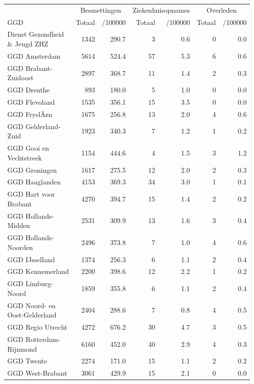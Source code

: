 \documentclass[
  english,
  man,floatsintext]{apa6}
\begin{document}
\begin{table}
\centering\begingroup\fontsize{10}{12}\selectfont

\begin{threeparttable}
\begin{tabular}{lrrrrrr}
\toprule
\multicolumn{1}{c}{ } & \multicolumn{2}{c}{Besmettingen} & \multicolumn{2}{c}{Ziekenhuisopnames} & \multicolumn{2}{c}{Overleden} \\
\cmidrule(l{3pt}r{3pt}){2-3} \cmidrule(l{3pt}r{3pt}){4-5} \cmidrule(l{3pt}r{3pt}){6-7}
GGD & Totaal & /100000 & Totaal & /100000 & Totaal & /100000\\
\midrule
Dienst Gezondheid \& Jeugd ZHZ & 1342 & 290.7 & 3 & 0.6 & 0 & 0.0\\
GGD Amsterdam & 5614 & 524.4 & 57 & 5.3 & 6 & 0.6\\
GGD Brabant-Zuidoost & 2897 & 368.7 & 11 & 1.4 & 2 & 0.3\\
GGD Drenthe & 893 & 180.0 & 5 & 1.0 & 0 & 0.0\\
GGD Flevoland & 1535 & 356.1 & 15 & 3.5 & 0 & 0.0\\
GGD FryslÃ¢n & 1675 & 256.8 & 13 & 2.0 & 4 & 0.6\\
GGD Gelderland-Zuid & 1923 & 340.3 & 7 & 1.2 & 1 & 0.2\\
GGD Gooi en Vechtstreek & 1154 & 444.6 & 4 & 1.5 & 3 & 1.2\\
GGD Groningen & 1617 & 275.5 & 12 & 2.0 & 2 & 0.3\\
GGD Haaglanden & 4153 & 369.3 & 34 & 3.0 & 1 & 0.1\\
GGD Hart voor Brabant & 4270 & 394.7 & 15 & 1.4 & 2 & 0.2\\
GGD Hollands-Midden & 2531 & 309.9 & 13 & 1.6 & 3 & 0.4\\
GGD Hollands-Noorden & 2496 & 373.8 & 7 & 1.0 & 4 & 0.6\\
GGD IJsselland & 1374 & 256.3 & 6 & 1.1 & 2 & 0.4\\
GGD Kennemerland & 2200 & 398.6 & 12 & 2.2 & 1 & 0.2\\
GGD Limburg-Noord & 1859 & 355.8 & 6 & 1.1 & 2 & 0.4\\
GGD Noord- en Oost-Gelderland & 2404 & 288.6 & 7 & 0.8 & 4 & 0.5\\
GGD Regio Utrecht & 4272 & 676.2 & 30 & 4.7 & 3 & 0.5\\
GGD Rotterdam-Rijnmond & 6160 & 452.0 & 40 & 2.9 & 4 & 0.3\\
GGD Twente & 2274 & 171.0 & 15 & 1.1 & 2 & 0.2\\
GGD West-Brabant & 3061 & 429.9 & 15 & 2.1 & 0 & 0.0\\

\end{tabular}
\end{threeparttable}
\end{table}
\end{document}
